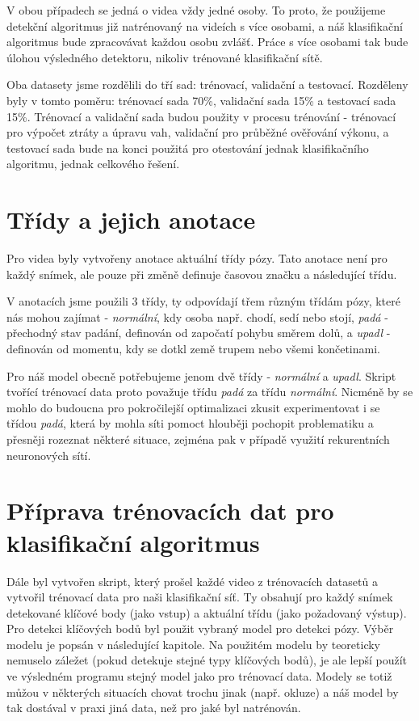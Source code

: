 V obou případech se jedná o videa vždy jedné osoby. To proto, že použijeme
detekční algoritmus již natrénovaný na videích s více osobami, a náš
klasifikační algoritmus bude zpracovávat každou osobu zvlášť. Práce s více
osobami tak bude úlohou výsledného detektoru, nikoliv trénované klasifikační
sítě.

Oba datasety jsme rozdělili do tří sad: trénovací, validační a testovací.
Rozděleny byly v tomto poměru: trénovací sada 70\%, validační sada 15\% a
testovací sada 15\%. Trénovací a validační sada budou použity v procesu
trénování - trénovací pro výpočet ztráty a úpravu vah, validační pro průběžné
ověřování výkonu, a testovací sada bude na konci použitá pro otestování jednak
klasifikačního algoritmu, jednak celkového řešení.

\section{Třídy a jejich anotace}
Pro videa byly vytvořeny anotace aktuální třídy pózy. Tato anotace není pro
každý snímek, ale pouze při změně definuje časovou značku a následující třídu.

V anotacích jsme použili 3 třídy, ty odpovídají třem různým třídám pózy, které
nás mohou zajímat - \textit{normální}, kdy osoba např. chodí, sedí nebo stojí,
\textit{padá} - přechodný stav padání, definován od započatí pohybu směrem
dolů, a \textit{upadl} - definován od momentu, kdy se dotkl země trupem nebo
všemi končetinami.

Pro náš model obecně potřebujeme jenom dvě třídy - \textit{normální} a
\textit{upadl}. Skript tvořící trénovací data proto považuje třídu
\textit{padá} za třídu \textit{normální}. Nicméně by se mohlo do budoucna pro pokročilejší
optimalizaci zkusit experimentovat i se třídou \textit{padá}, která by mohla
síti pomoct hlouběji pochopit problematiku a přesněji rozeznat některé situace,
zejména pak v případě využití rekurentních neuronových sítí.

\section{Příprava trénovacích dat pro klasifikační algoritmus}

Dále byl vytvořen skript, který prošel každé video z trénovacích datasetů a
vytvořil trénovací data pro naši klasifikační síť. Ty obsahují pro každý snímek
detekované klíčové body (jako vstup) a aktuální třídu (jako požadovaný výstup).
Pro detekci klíčových bodů byl použit vybraný model pro detekci pózy. Výběr
modelu je popsán v následující kapitole. Na použitém modelu by teoreticky
nemuselo záležet (pokud detekuje stejné typy klíčových bodů), je ale lepší
použít ve výsledném programu stejný model jako pro trénovací data. Modely se
totiž můžou v některých situacích chovat trochu jinak (např. okluze) a náš
model by tak dostával v praxi jiná data, než pro jaké byl natrénován.

